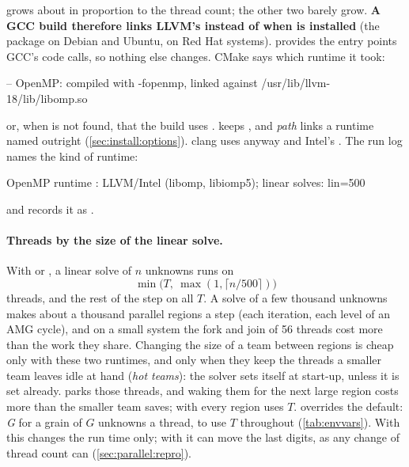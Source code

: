  grows about in proportion to the thread count;
the other two barely grow. \textbf{A GCC build therefore links LLVM's
 instead of  when  is installed}
(the package  on Debian and Ubuntu,  on Red Hat
systems).  provides the entry points GCC's code calls, so nothing
else changes. CMake says which runtime it took:
\begin{shell}
-- OpenMP: compiled with -fopenmp, linked against /usr/lib/llvm-18/lib/libomp.so
\end{shell}
or, when  is not found, that the build uses .
 keeps , and
\textit{path} links a runtime named outright
(\cref{sec:install:options}). clang uses  anyway and Intel's
 . The run log names the kind of runtime:
\begin{shell}
 OpenMP runtime  : LLVM/Intel (libomp, libiomp5); linear solves: lin=500
\end{shell}
and  records it as .

\paragraph{Threads by the size of the linear solve.}
With  or , a linear solve of $n$ unknowns runs on
\[
  \min\bigl(T,\ \max(1, \lceil n / 500 \rceil)\bigr)
\]
threads, and the rest of the step on all $T$. A solve of a few thousand
unknowns makes about a thousand parallel regions a step (each iteration, each
level of an AMG cycle), and on a small system the fork and join of 56 threads
cost more than the work they share. Changing the size of a team between
regions is cheap only with these two runtimes, and only when they keep the
threads a smaller team leaves idle at hand (\emph{hot teams}): the solver sets
 itself at start-up, unless it is set already.
 parks those threads, and waking them for the next large region
costs more than the smaller team saves; with  every region uses
$T$.  overrides the default: \textit{G} for a
grain of $G$ unknowns a thread,  to use $T$ throughout
(\cref{tab:envvars}). With  this changes the run time only; with
 it can move the last digits, as any change of thread count can
(\cref{sec:parallel:repro}).

